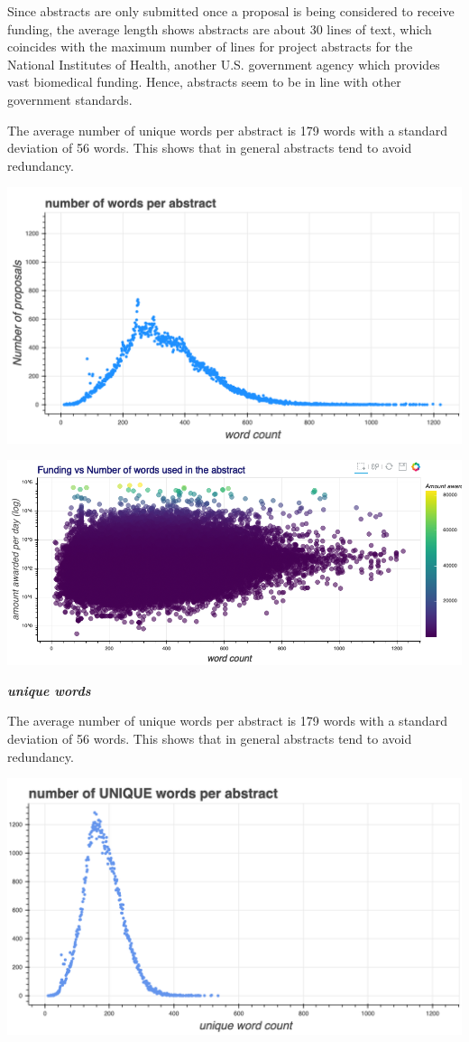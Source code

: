 \documentclass[11pt, oneside]{article}   	%
\begin{document}
Since abstracts are only submitted once a proposal is being considered to receive funding, the average length shows abstracts are about 30 lines of text, which coincides with the maximum number of lines for project abstracts for the National Institutes of Health, another U.S. government agency which provides vast biomedical funding. Hence, abstracts seem to be in line with other government standards.

The average number of unique words per abstract is 179 words with a standard deviation of 56 words. This shows that in general abstracts tend to avoid redundancy.

\includegraphics[width=\textwidth]{totalwordcount}

\includegraphics[width=\textwidth]{wordawards}

\textbf{\emph{unique words}}

The average number of unique words per abstract is 179 words with a standard deviation of 56 words. This shows that in general abstracts tend to avoid redundancy.

\includegraphics[width=\textwidth]{uniquewords}
\end{document}
